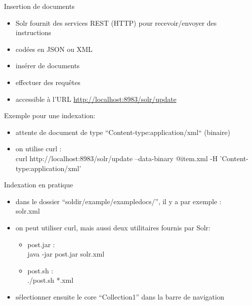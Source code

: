       
\begin{frame}[fragile]{Insertion de documents}

   \begin{itemize}
     \item Solr fournit des services REST (HTTP) pour recevoir/envoyer des
       instructions
     \item codées en JSON ou XML
\item insérer de documents
\item effectuer des requêtes
\smallskip
\item accessible à l'URL \url{http://localhost:8983/solr/update}
   \end{itemize}
Exemple pour une indexation:
\begin{itemize}
  \item attente de document de type ``Content-type:application/xml`` (binaire)
  \item on utilise curl :\\
curl http://localhost:8983/solr/update --data-binary @item.xml  -H 'Content-type:application/xml'
\end{itemize}
\end{frame}
   
\begin{frame}{Indexation en pratique}
     \begin{itemize}
       \item dans le dossier ``soldir/example/exampledocs/'', il y a par
         exemple :\\
         solr.xml
       \item on peut utiliser curl, mais aussi deux utilitaires fournis par
         Solr:
         \begin{itemize}
           \item post.jar :\\
             java -jar post.jar solr.xml
           \item post.sh :\\
             ./post.sh *.xml
         \end{itemize}
   \item sélectionner ensuite le core ``Collection1'' dans la barre de
     navigation
     \end{itemize}
\end{frame}

   
       
